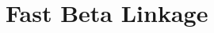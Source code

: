 \documentclass[ba]{imsart}
\begin{document}

\section{Fast Beta Linkage}
\label{sec:fast-beta-linkage}
\end{document}

